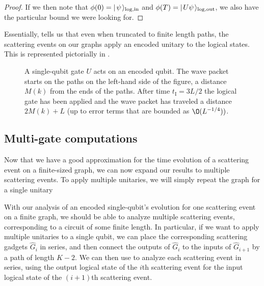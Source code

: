 \documentclass[../thesis-main/thesis-main]{subfiles}
\begin{document}
\begin{proof}
If we then note that $\phi(0) = |\mspace{2mu} \psi \mspace{2mu} \rangle_{\text{log},\text{in}}$ and $\phi(T) = |\mspace{2mu} U \psi \mspace{2mu} \rangle_{\text{log},\text{out}}$, we also have the particular bound we were looking for.
\end{proof}

Essentially,  tells us that even when truncated to finite length paths, the scattering events on our graphs apply an encoded unitary to the logical states.  This is represented pictorially in .
 


\begin{figure}
  \centering
  
  \caption{A single-qubit gate $U$ acts on an encoded qubit. The wave packet starts on the paths on the left-hand side of the figure, a distance $M(k)$ from the ends of the paths. After time $t_{\mathrm{I}}={3L}/{2}$ the logical gate has been applied and the wave packet has traveled a distance $2M(k)+L$ (up to error terms that are bounded as $\O(L^{-{1}/{4}}))$.}
  \label{fig:single_particle_cartoon}
\end{figure}


\subsection{Multi-gate computations}\label{sec:single_qubit_multi_gate_computation}


Now that we have a good approximation for the time evolution of a scattering event on a finite-sized graph, we can now expand our results to multiple scattering events.  To apply multiple unitaries, we will simply repeat the graph for a single unitary


With our analysis of an encoded single-qubit's evolution for one scattering event on a finite graph, we should be able to analyze multiple scattering events, corresponding to a circuit of some finite length.  In particular, if we want to apply multiple unitaries to a single qubit, we can place the corresponding scattering gadgets $\widehat{G}_i$ in series, and then connect the outputs of $\widehat{G}_i$ to the inputs of $\widehat{G}_{i+1}$ by a path of length $K - 2$.  We can then use  to analyze each scattering event in series, using the output logical state of the $i$th scattering event for the input logical state of the $(i+1)$th scattering event.
\end{document}
